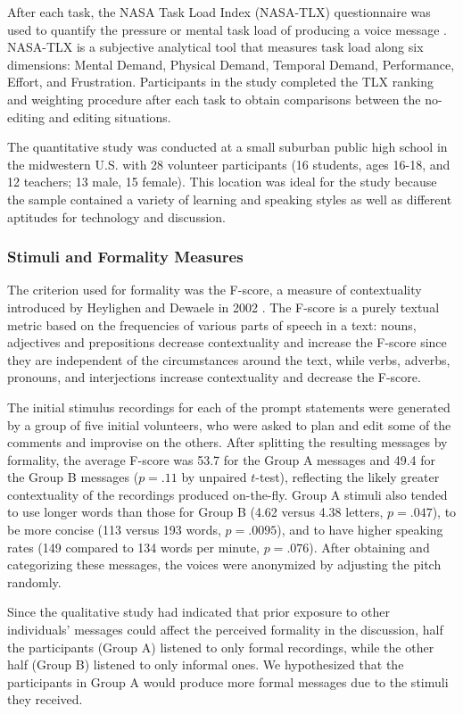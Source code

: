 After each task, the NASA Task Load Index (NASA-TLX) questionnaire was used to quantify the pressure or mental task load of producing a voice message \cite{nasatlx}. 
NASA-TLX is a subjective analytical tool that measures task load along six dimensions: Mental Demand, Physical Demand, Temporal Demand, Performance, Effort, and Frustration. 
Participants in the study completed the TLX ranking and weighting procedure after each task to obtain comparisons between the no-editing and editing situations.

The quantitative study was conducted at a small suburban public high school in the midwestern U.S. with 28 volunteer participants (16 students, ages 16-18, and 12 teachers; 13 male, 15 female).
This location was ideal for the study because the sample contained a variety of learning and speaking styles as well as different aptitudes for technology and discussion. 

\subsubsection{Stimuli and Formality Measures}\label{stimuli}
The criterion used for formality was the F-score, a measure of contextuality introduced by Heylighen and Dewaele in 2002 \cite{heylighen}.
The F-score is a purely textual metric based on the frequencies of various parts of speech in a text: nouns, adjectives and prepositions decrease contextuality and increase the F-score since they are independent of the circumstances around the text, while verbs, adverbs, pronouns, and interjections increase contextuality and decrease the F-score. 

The initial stimulus recordings for each of the prompt statements were generated by a group of five initial volunteers, who were asked to plan and edit some of the comments and improvise on the others. 
After splitting the resulting messages by formality, the average F-score was 53.7 for the Group A messages and 49.4 for the Group B messages ($p=.11$ by unpaired $t$-test), reflecting the likely greater contextuality of the recordings produced on-the-fly.
Group A stimuli also tended to use longer words than those for Group B (4.62 versus 4.38 letters, $p=.047$), to be more concise (113 versus 193 words, $p=.0095$), and to have higher speaking rates (149 compared to 134 words per minute, $p=.076$).
After obtaining and categorizing these messages, the voices were anonymized by adjusting the pitch randomly.

Since the qualitative study had indicated that prior exposure to other individuals' messages could affect the perceived formality in the discussion, half the participants (Group A) listened to only formal recordings, while the other half (Group B) listened to only informal ones.
We hypothesized that the participants in Group A would produce more formal messages due to the stimuli they received.

